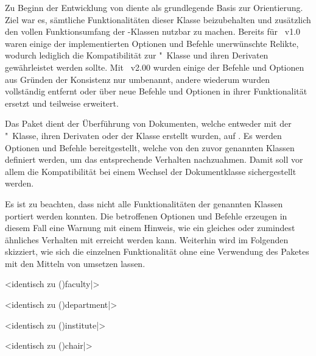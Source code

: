 \begin{DeclareEntity}{}
Zu Beginn der Entwicklung von \TUDScript diente  als 
grundlegende Basis zur Orientierung. Ziel war es, sämtliche Funktionalitäten 
dieser Klasse beizubehalten und zusätzlich den vollen Funktionsumfang der 
\KOMAScript-Klassen nutzbar zu machen. Bereits für \TUDScript~v1.0 waren einige 
der implementierten Optionen und Befehle unerwünschte Relikte, wodurch 
lediglich die Kompatibilität zur "~Klasse und ihren 
Derivaten gewährleistet werden sollte. Mit \TUDScript~v2.00 wurden einige der 
Befehle und Optionen aus Gründen der Konsistenz nur umbenannt, andere wiederum 
wurden vollständig entfernt oder über neue Befehle und Optionen in ihrer 
Funktionalität ersetzt und teilweise erweitert. 

Das Paket  dient der Überführung von Dokumenten, welche
entweder mit der "~Klasse, ihren Derivaten oder der Klasse 
 erstellt wurden, auf \vTUDScript*{\TUDScript}. Es 
werden Optionen und Befehle bereitgestellt, welche von den zuvor genannten 
Klassen definiert werden, um das entsprechende Verhalten nachzuahmen. Damit 
soll vor allem die Kompatibilität bei einem Wechsel der Dokumentklasse 
sichergestellt werden.
%
\begin{quoting}
\end{quoting}
%
Es ist zu beachten, dass nicht alle Funktionalitäten der genannten Klassen 
portiert werden konnten. Die betroffenen Optionen und Befehle erzeugen in 
diesem Fall eine Warnung mit einem Hinweis, wie ein gleiches oder zumindest 
ähnliches Verhalten mit \TUDScript erreicht werden kann. Weiterhin wird im 
Folgenden skizziert, wie sich die einzelnen Funktionalität ohne eine Verwendung 
des Paketes  mit den Mitteln von \TUDScript umsetzen 
lassen. 

\begin{Declaration}
  {}
  <identisch zu \Macro*(){faculty|}>
\begin{Declaration}
  {}
  <identisch zu \Macro*(){department|}>
\begin{Declaration}
  {}
  <identisch zu \Macro*(){institute|}>
\begin{Declaration}
  {}
  <identisch zu \Macro*(){chair|}>
\printdeclarationlist


\end{Declaration}
\end{Declaration}
\end{Declaration}
\end{Declaration}
\end{DeclareEntity}
